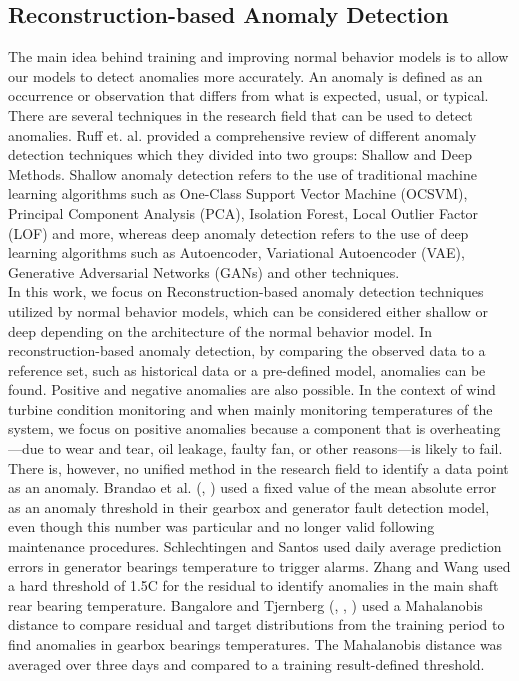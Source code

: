   \subsection{Reconstruction-based Anomaly Detection}
    The main idea behind training and improving normal behavior models is to allow our models to detect anomalies more accurately.
    An anomaly is defined as an occurrence or observation that differs from what is expected, usual, or typical. There are several techniques 
    in the research field that can be used to detect anomalies. Ruff et. al. \cite{Anomaly_Detection} provided a comprehensive review of different anomaly 
    detection techniques which they divided into two groups: Shallow and Deep Methods. 
    Shallow anomaly detection refers to the use of traditional machine learning algorithms such as One-Class Support Vector Machine (OCSVM), Principal Component Analysis (PCA), Isolation Forest, Local Outlier Factor (LOF) and more,
    whereas deep anomaly detection refers to the use of deep learning algorithms such as Autoencoder, Variational Autoencoder (VAE), Generative Adversarial Networks (GANs) and other techniques. \\
    In this work, we focus on Reconstruction-based anomaly detection techniques utilized by normal behavior models, which can be considered either shallow or deep depending on the 
    architecture of the normal behavior model.
    In reconstruction-based anomaly detection, by comparing the observed data to a reference set, such as historical data or a pre-defined model, anomalies can be found.
    Positive and negative anomalies are also possible. In the context of wind
    turbine condition monitoring and when mainly monitoring temperatures of the system, we focus on positive anomalies because a component that is 
    overheating---due to wear and tear, oil leakage, faulty fan, or other reasons---is likely to fail. There is, however, no unified method in the research field to identify a data point 
    as an anomaly. Brandao et al. (\cite{Brandao_1}, \cite{Brandao_2}) used a fixed value of the mean absolute error as an anomaly threshold in their 
    gearbox and generator fault detection model, even though this number was particular and no longer valid following maintenance procedures. 
    Schlechtingen and Santos \cite{Schlechtingen} used daily average prediction errors in generator bearings temperature to trigger alarms. 
    Zhang and Wang \cite{Zhang_Wang} used a hard threshold of 1.5\degree C for the residual to identify anomalies in the main shaft rear bearing temperature.
    Bangalore and Tjernberg (\cite{Bangalore_1}, \cite{Bangalore_2}, \cite{Bangalore_3}) used a Mahalanobis distance to compare residual and target distributions from 
    the training period to find anomalies in gearbox bearings temperatures. The Mahalanobis distance was averaged over three days and compared to a training result-defined threshold.\\

